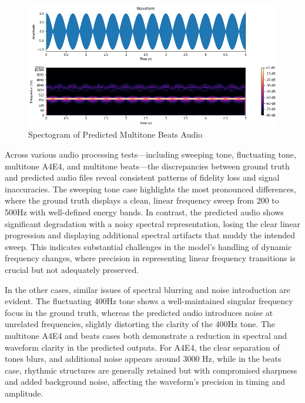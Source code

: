 \documentclass{ioereport}
\begin{document}
    \begin{figure}[H]
        \centering
        \includegraphics[width=\linewidth]{assets/audio_results/multitoneBeatspred.png}
        \caption{Spectogram of Predicted Multitone Beats Audio}
        \label{fig:pred-multibeat-spec}
    \end{figure}

Across various audio processing tests—including sweeping tone, fluctuating tone, multitone A4E4, and multitone beats—the discrepancies between ground truth and predicted audio files reveal consistent patterns of fidelity loss and signal inaccuracies. The sweeping tone case highlights the most pronounced differences, where the ground truth displays a clean, linear frequency sweep from 200 to 500Hz with well-defined energy bands. In contrast, the predicted audio shows significant degradation with a noisy spectral representation, losing the clear linear progression and displaying additional spectral artifacts that muddy the intended sweep. This indicates substantial challenges in the model's handling of dynamic frequency changes, where precision in representing linear frequency transitions is crucial but not adequately preserved.

In the other cases, similar issues of spectral blurring and noise introduction are evident. The fluctuating 400Hz tone shows a well-maintained singular frequency focus in the ground truth, whereas the predicted audio introduces noise at unrelated frequencies, slightly distorting the clarity of the 400Hz tone. The multitone A4E4 and beats cases both demonstrate a reduction in spectral and waveform clarity in the predicted outputs. For A4E4, the clear separation of tones blurs, and additional noise appears around 3000 Hz, while in the beats case, rhythmic structures are generally retained but with compromised sharpness and added background noise, affecting the waveform’s precision in timing and amplitude.
\end{document}

